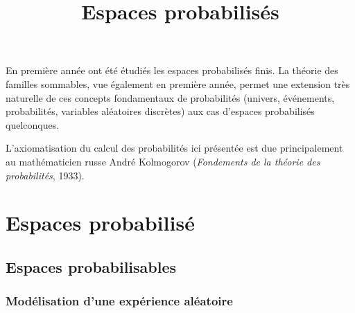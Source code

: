 \documentclass[french]{article}
\title{Espaces probabilisés}
\date{}
\theoremstyle{plain}
\theoremstyle{definition}
\theoremstyle{remark}
\begin{document}
\tableofcontents

\newpage
\maketitle

En première année ont été étudiés les espaces probabilisés finis. La théorie des familles sommables, vue également en première année, permet une extension très naturelle de ces concepts fondamentaux de probabilités (univers, événements, probabilités, variables aléatoires discrètes) aux cas d'espaces probabilisés quelconques.

L'axiomatisation du calcul des probabilités ici présentée est due principalement au mathématicien russe André Kolmogorov (\textit{Fondements de la théorie des probabilités}, 1933).

\section{Espaces probabilisé}

\subsection{Espaces probabilisables}

\subsubsection*{Modélisation d'une expérience aléatoire}
\end{document}
